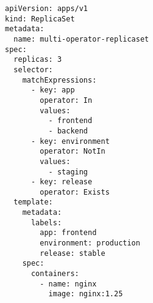 \begin{verbatim}
apiVersion: apps/v1
kind: ReplicaSet
metadata:
  name: multi-operator-replicaset
spec:
  replicas: 3
  selector:
    matchExpressions:
      - key: app
        operator: In
        values:
          - frontend
          - backend
      - key: environment
        operator: NotIn
        values:
          - staging
      - key: release
        operator: Exists
  template:
    metadata:
      labels:
        app: frontend
        environment: production
        release: stable
    spec:
      containers:
        - name: nginx
          image: nginx:1.25
\end{verbatim}
